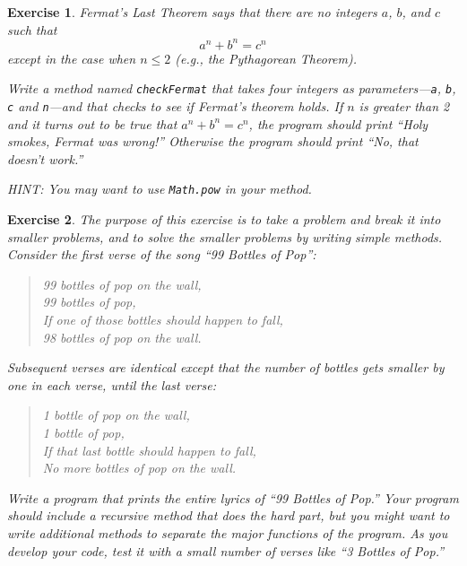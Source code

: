 \documentclass[12pt]{book}
\theoremstyle{exercise}
\newtheorem{exercise}{Exercise}[chapter]
\newcommand{\java}[1]{\lstinline{#1}} %
\begin{document}
\begin{exercise}
Fermat's Last Theorem says that there are no integers $a$, $b$, and $c$ such that
\[ a^n + b^n = c^n \]
except in the case when $n \leq 2$ (e.g., the Pythagorean Theorem).

Write a method named {\tt checkFermat} that takes four integers as parameters---{\tt a}, {\tt b}, {\tt c} and {\tt n}---and that checks to see if Fermat's theorem holds.
If $n$ is greater than 2 and it turns out to be true that $a^n + b^n = c^n$, the program should print ``Holy smokes, Fermat was wrong!''
Otherwise the program should print ``No, that doesn't work.''

HINT: You may want to use \java{Math.pow} in your method.
\end{exercise}

\begin{exercise}
The purpose of this exercise is to take a problem and break it into smaller problems, and to solve the smaller problems by writing simple methods. Consider the first verse of the song ``99 Bottles of Pop'':

\begin{quote}
99 bottles of pop on the wall,\\
99 bottles of pop,\\
If one of those bottles should happen to fall,\\
98 bottles of pop on the wall.
\end{quote}

Subsequent verses are identical except that the number of bottles gets smaller by one in each verse, until the last verse:

\begin{quote}
1 bottle of pop on the wall,\\
1 bottle of pop,\\
If that last bottle should happen to fall,\\
No more bottles of pop on the wall.
\end{quote}


Write a program that prints the entire lyrics of ``99 Bottles of Pop.''
Your program should include a {\it recursive} method that does the hard part, but you might want to write additional methods to separate the major functions of the program.
As you develop your code, test it with a small number of verses like ``3 Bottles of Pop.''
\end{exercise}
\end{document}
